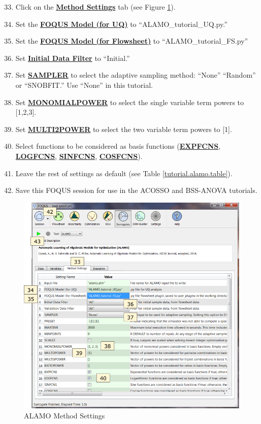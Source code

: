 \begin{enumerate}
	\setcounter{enumi}{32}
	\item Click on the \textbf{\underline{Method Settings}} tab (see Figure \ref{fig.alamo.method.settigs}).
	\item Set the \textbf{\underline{FOQUS Model (for UQ)}} to ``ALAMO\_tutorial\_UQ.py.'' 
	\item Set the \textbf{\underline{FOQUS Model (for Flowsheet)}} to ``ALAMO\_tutorial\_FS.py''
	\item Set \textbf{\underline{Initial Data Filter}} to ``Initial.''
	\item Set \textbf{\underline{SAMPLER}} to select the adaptive sampling method: ``None'' ``Random'' or ``SNOBFIT.'' Use ``None'' in this tutorial.
	\item Set \textbf{\underline{MONOMIALPOWER}} to select the single variable term powers to [1,2,3].
	\item Set \textbf{\underline{MULTI2POWER}} to select the two variable term powers to [1].
	\item Select functions to be considered as basis functions (\textbf{\underline{EXPFCNS}}, \textbf{\underline{LOGFCNS}}, \textbf{\underline{SINFCNS}}, \textbf{\underline{COSFCNS}}).
	\item Leave the rest of settings as default (see Table \ref{tutorial.alamo.table}).
	\item Save this FOQUS session for use in the ACOSSO and BSS-ANOVA tutorials.
\end{enumerate}
\begin{figure}[H]
	\begin{center}
		\includegraphics[scale=0.55]{Chapt_surrogates/figs/alamo_settings}
		\caption{ALAMO Method Settings}
		\label{fig.alamo.method.settigs}
	\end{center}
\end{figure}


